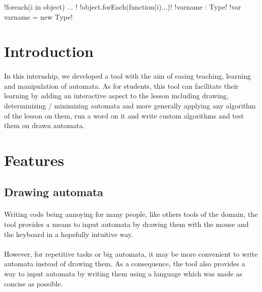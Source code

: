 \documentclass{article}
\begin{document}
\maketitle
\tableofcontents
\begin{sloppypar}
\DefineShortVerb{\!}
!foreach(i in object) { ... }!
!object.forEach(function(i){...})!
!varname : Type!
!var varname = new Type!
\UndefineShortVerb{\!}




\section*{ Introduction}


\paragraph{}
In this internship, we developed a tool with the aim of easing teaching, learning and manipulation of automata. As for students, this tool can facilitate their learning by adding an interactive aspect to the lesson including drawing, determinizing / minimizing automata and more generally applying any algorithm of the lesson on them, run a word on it and write custom algorithms and test them on drawn automata.




\section{ Features}



\subsection{ Drawing automata}


\paragraph{}
Writing code being annoying for many people, like others tools of the domain, the tool provides a means to input automata by drawing them with the mouse and the keyboard in a hopefully intuitive way.

      
\paragraph{}
However, for repetitive tasks or big automata, it may be more convenient to write automata instead of drawing them. As a consequence, the tool also provides a way to input automata by writing them using a language which was made as concise as possible.


\end{sloppypar}
\end{document}
